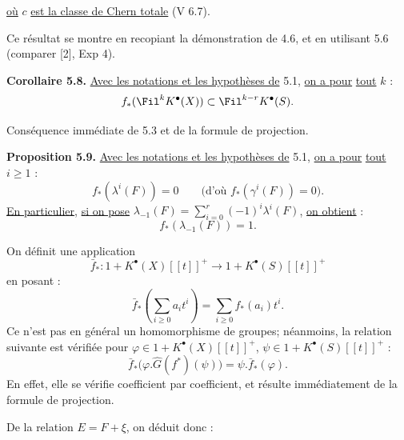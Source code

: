 
\uline{où} $c$ \uline{est la
classe de Chern totale} (V 6.7).

Ce résultat se montre en recopiant la démonstration de 4.6, et en utilisant 5.6 (comparer [2], Exp 4).

\textbf{Corollaire 5.8.} \uline{Avec les notations et les hypothèses de} 5.1, \uline{on a pour} \uline{tout} $k$ :
\[
  f_*(\Fil^kK^{\bullet}(X))\subset \Fil^{k-r}K^{\bullet}(S).
\]

Conséquence immédiate de 5.3 et de la formule de projection.

\textbf{Proposition 5.9.} \uline{Avec les notations et les hypothèses de} 5.1, \uline{on a pour} \uline{tout} $i\ge 1$ :
\[
  f_*(\lambda^i(F))=0\qquad\bigl(\text{d'où }f_*(\gamma^i(F))=0\bigr).
\]
\uline{En particulier}, \uline{si on pose} $\lambda_{-1}(F)=\sum_{i=0}^{r}(-1)^i\lambda^i(F)$, \uline{on obtient} :
\[
  f_*(\lambda_{-1}(F))=1.
\]

On définit une application
\[
  \bar f_*:1+K^{\bullet}(X)[[t]]^+\longrightarrow 1+K^{\bullet}(S)[[t]]^+
\]
en posant :
\[
  \bar f_*\left(\sum_{i\ge0}a_it^i\right)=\sum_{i\ge0}f_*(a_i)t^i .
\]
Ce n'est pas en général un homomorphisme de groupes; néanmoins, la relation suivante est vérifiée pour $\varphi\in 1+K^{\bullet}(X)[[t]]^+$, $\psi\in 1+K^{\bullet}(S)[[t]]^+$ :
\[
  \bar f_*\bigl(\varphi.\hat G(f^*)(\psi)\bigr)=\psi.\bar f_*(\varphi).
\]
En effet, elle se vérifie coefficient par coefficient, et résulte immédiatement de la formule de projection.

De la relation $E=F+\xi$, on déduit donc :
